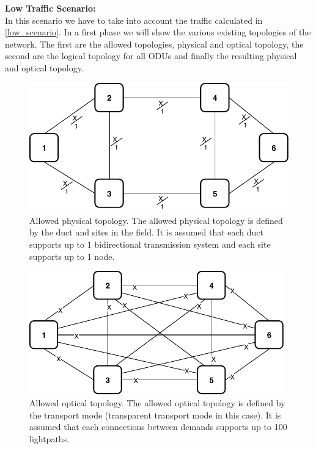 \vspace{17pt}
\textbf{Low Traffic Scenario:}\\

In this scenario we have to take into account the traffic calculated in \ref{low_scenario}. In a first phase we will show the various existing topologies of the network. The first are the allowed topologies, physical and optical topology, the second are the logical topology for all ODUs and finally the resulting physical and optical topology.\\

\begin{figure}[h!]
\centering
\includegraphics[width=13cm]{sdf/ilp/transparent_protection/figures/allowed_physical_topology}
\caption{Allowed physical topology. The allowed physical topology is defined by the duct and sites in the field. It is assumed that each duct supports up to 1 bidirectional transmission system and each site supports up to 1 node.}
\label{allowed2_physical_protectionlow}
\end{figure}
\newpage
\begin{figure}[h!]
\centering
\includegraphics[width=11cm]{sdf/ilp/transparent_protection/figures/allowed_optical_topology}
\caption{Allowed optical topology. The allowed optical topology is defined by the transport mode (transparent transport mode in this case). It is assumed that each connections between demands supports up to 100 lightpaths.}
\label{allowed2_optical_protectionlow}
\end{figure}

